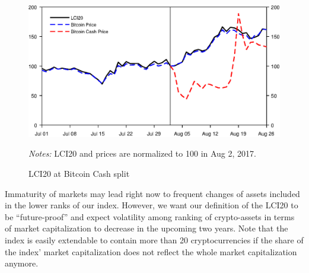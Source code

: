 \documentclass[11pt]{article}
\newcommand\fnotes[1]{\captionsetup{font=scriptsize}\caption*{\textsl{Notes:} #1}}
\begin{document}
\begin{figure}[ht]%
    \centering%
    \caption{LCI20 at Bitcoin Cash split}\label{f:split}%
    \includegraphics[width=.8\textwidth]{figs/lci20_bch_split.eps}%
    \smallskip\newline%
    \fnotes{LCI20 and prices are normalized to 100 in Aug 2, 2017.}
\end{figure}

Immaturity of markets may lead right now to frequent changes of assets included in the lower ranks of our index.
However, we want our definition of the LCI20 to be ``future-proof'' and expect volatility among ranking of crypto-assets in terms of market capitalization to decrease in the upcoming two years. Note that the index is easily extendable to contain more than 20 cryptocurrencies if the share of the index' market capitalization does not reflect the whole market capitalization anymore.






\end{document}
